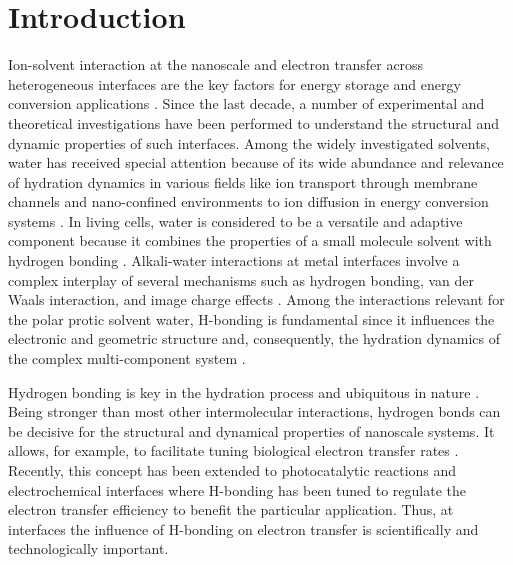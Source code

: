 \documentclass[aps,twocolumn,amssymb,amsfonts,amsmath,showpacs,final,a4paper,superscriptaddress]{revtex4-2}
\begin{document}
\maketitle
\section{Introduction}

Ion-solvent interaction at the nanoscale and electron transfer across heterogeneous interfaces are the key factors for energy storage and energy conversion applications \cite{Regan_1991, Fujishima_1972}. Since the last decade, a number of experimental and theoretical \cite{Roy_2018, Lee_2017, Bragg_2010}  investigations have been performed to understand the structural and dynamic properties of such interfaces. Among the widely investigated solvents, water has received special attention because of its wide abundance and relevance of hydration dynamics in various fields like ion transport through membrane channels and nano-confined environments \cite{swanson_2007,kratochvil_2016,cao_2010} to ion diffusion in energy conversion systems \cite{pean_2015,ong_2015}. In living cells, water is considered to be a versatile and adaptive component because it combines the properties of a small molecule solvent with hydrogen bonding \cite{ball_2007}. Alkali-water interactions at metal interfaces involve a complex interplay of several mechanisms such as hydrogen bonding, van der Waals interaction, and image charge effects \cite{ paz_2021}. Among the interactions relevant for the polar protic solvent water, H-bonding is fundamental since it influences the electronic and geometric structure and, consequently, the hydration dynamics of the complex multi-component system \cite{Nibbering_2007}.

Hydrogen bonding is key in the hydration process and ubiquitous in nature \cite{xantheas_dunning_1993,Nibbering_2007}. Being stronger than most other intermolecular interactions, hydrogen bonds can be decisive for the structural and dynamical properties of nanoscale systems. It allows, for example, to facilitate tuning biological electron transfer rates \cite{Rege_1995}. Recently, this concept has been extended to photocatalytic reactions \cite{Breg_2021} and electrochemical interfaces \cite{Chen_2022} where H-bonding has been tuned to regulate the electron transfer efficiency to benefit the particular application. Thus, at interfaces the influence of H-bonding on electron transfer is  scientifically and technologically important.
\end{document}
